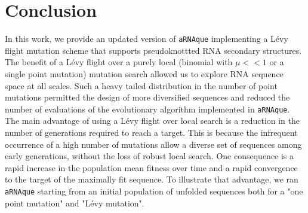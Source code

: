 
\section{Conclusion}

In this work, we provide an updated version of \texttt{aRNAque} implementing a Lévy flight mutation scheme that supports pseudoknottted RNA secondary structures. The benefit of a Lévy flight over a purely local (binomial with $\mu<<1$ or a single point mutation) mutation search allowed us to explore RNA sequence space at all scales. Such a heavy tailed distribution in the number of point mutations permitted the design of more diversified sequences and reduced the number of evaluations of the evolutionary algorithm implemented in \texttt{aRNAque}. The main advantage of using a Lévy flight over local search is a reduction in the number of generations required to reach a target. This is because the infrequent occurrence of a high number of mutations allow a diverse set of sequences among early generations, without the loss of robust local search. One consequence is a rapid increase in the population mean fitness over time and a rapid convergence to the target of the maximally fit sequence. To illustrate that advantage, we ran \texttt{aRNAque} starting from an initial population of unfolded sequences both for a "one point mutation" and "Lévy mutation".

